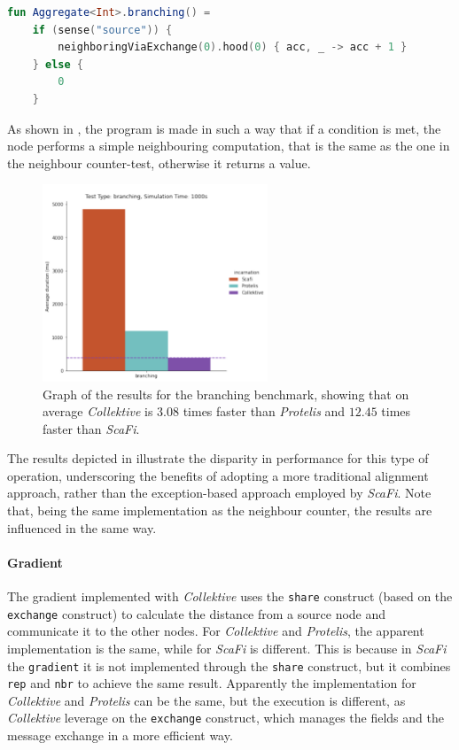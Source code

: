 \begin{lstlisting}[language=kt, caption={Branching code example}, label={lst:branching-example}]
fun Aggregate<Int>.branching() =
    if (sense("source")) {
        neighboringViaExchange(0).hood(0) { acc, _ -> acc + 1 }
    } else {
        0
    }
\end{lstlisting}

As shown in , the program is made in such a way that if a condition is met, the node
performs a simple neighbouring computation, that is the same as the one in the neighbour counter-test, otherwise it returns a value.

\begin{figure}[ht!]
    \centering
    \includegraphics[width=0.6\textwidth]{figures/branching-results}
    \caption{Graph of the results for the branching benchmark, showing that on average \emph{Collektive} is $3.08$ times faster
    than \emph{Protelis} and $12.45$ times faster than \emph{ScaFi}.}
    \label{fig:branching}
\end{figure}

The results depicted in  illustrate the disparity in performance for this type of operation,
underscoring the benefits of adopting a more traditional alignment approach, rather than the exception-based approach
employed by \emph{ScaFi}.
Note that, being the same implementation as the neighbour counter, the results are influenced in the same way.

\paragraph{Gradient}
The gradient implemented with \emph{Collektive} uses the \texttt{share} construct (based on the \texttt{exchange} construct) to
calculate the distance from a source node and communicate it to the other nodes.
For \emph{Collektive} and \emph{Protelis}, the apparent implementation is the same, while for \emph{ScaFi} is different.
This is because in \emph{ScaFi} the \texttt{gradient} it is not implemented through the \texttt{share} construct, but
it combines \texttt{rep} and \texttt{nbr} to achieve the same result.
Apparently the implementation for \emph{Collektive} and \emph{Protelis} can be the same, but the execution is different, as
\emph{Collektive} leverage on the \texttt{exchange} construct, which manages the fields and the message exchange
in a more efficient way.

